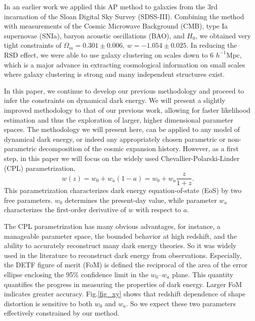 \documentclass[prl,twocolumn,superscriptaddress,aps,amsmath,amssymb,nofootinbib,altaffilletter]{revtex4}
\begin{document}
In an earlier work\citep{Li2016} we applied this AP method to galaxies from the 3rd incarnation of the Sloan Digital Sky Survey (SDSS-III). 
Combining the method with measurements of the Cosmic Microwave Background (CMB), type Ia supernovae (SNIa), 
baryon acoustic oscillations (BAO), and $H_0$,
we obtained very tight constraints of $ \Omega_m = 0.301 \pm 0.006,\ w=-1.054 \pm 0.025$.
In reducing the RSD effect, 
we were able to use galaxy clustering on scales down to 6 $h^{-1}$Mpc,
which is a major advance in extracting cosmological information 
on small scales where galaxy clustering is strong and many independent structures exist.



In this paper, we continue to develop our previous methodology and proceed to infer the constraints on dynamical dark energy. 
We will present a slightly improved methodology to that of our previous work\citep{Li2016}, 
allowing for faster likelihood estimation and thus the exploration of larger, higher dimensional parameter spaces. 
The methodology we will present here, can be applied to any model of dynamical dark energy, 
or indeed any appropriately chosen parametric or non-parametric decomposition of the cosmic expansion history. 
However, as a first step, in this paper we will focus on the widely used Chevallier-Polarski-Linder (CPL) parametrization\cite{CPL_CP,CPL_L},
\begin{equation}
w(z) = w_0 + w_a (1-a) = w_0 + w_a \frac{z}{1+z}.
\end{equation}
This parametrization characterizes dark energy equation-of-state (EoS) by two free parameters.
$w_0$ determines the present-day value, while parameter $w_a$ characterizes the first-order derivative of $w$ with respect to $a$. 

The CPL parametrization has many obvious advantages, for instance, a manageable parameter space, 
the bounded behavior at high redshift, 
and the ability to accurately reconstruct many dark energy theories\cite{CPL_L}. 
So it was widely used in the literature to reconstruct dark energy from observations.
Especially, the DETF figure of merit (FoM) is defined the reciprocal of the area of the error
ellipse enclosing the 95\% confidence limit in the $w_0–w_a$ plane. 
This quantity quantifies the progress in measuring the properties of dark energy.
Larger FoM indicates greater accuracy.
Fig.\ref{fig_xy} shows that redshift dependence of shape distortion is sensitive to both $w_0$ and $w_a$.
So we expect these two parameters effectively constrained by our method.
\end{document}
